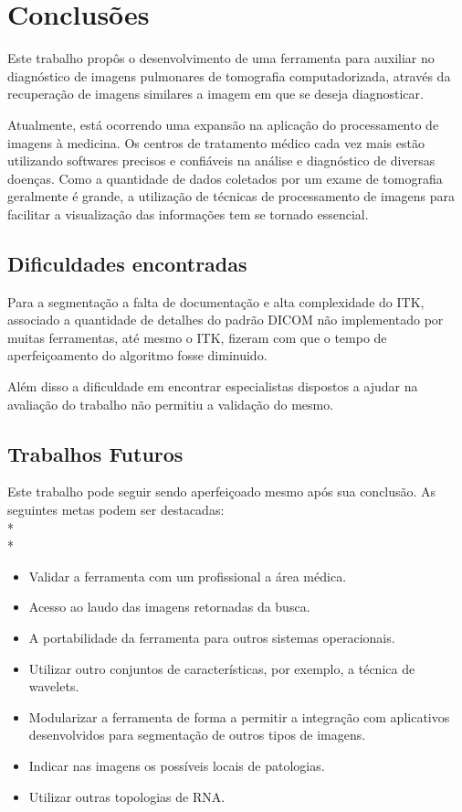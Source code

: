\chapter{Conclusões}

Este trabalho propôs o desenvolvimento de uma ferramenta para auxiliar no diagnóstico de imagens pulmonares de tomografia computadorizada, através da recuperação de imagens similares a imagem em que se deseja diagnosticar.

Atualmente, está ocorrendo uma expansão na aplicação do processamento de imagens à medicina. Os centros de tratamento médico cada vez mais estão utilizando softwares precisos e confiáveis na análise e diagnóstico de diversas doenças. Como a quantidade de dados coletados por um exame de tomografia geralmente é grande, a utilização de técnicas de processamento de imagens para facilitar a visualização das informações tem se tornado essencial.

\section{Dificuldades encontradas}

Para a segmentação a falta de documentação e alta complexidade do ITK, associado a quantidade de detalhes do padrão DICOM não implementado por muitas ferramentas, até mesmo o ITK, fizeram com que o tempo de aperfeiçoamento do algoritmo fosse diminuido.

Além disso a dificuldade em encontrar especialistas dispostos a ajudar na avaliação do trabalho não permitiu a validação do mesmo.

\section{Trabalhos Futuros}

Este trabalho pode seguir sendo aperfeiçoado mesmo após sua conclusão. As seguintes metas podem ser destacadas:
\\* \\*
\begin{itemize}
 \item Validar a ferramenta com um profissional a área médica.
 \item Acesso ao laudo das imagens retornadas da busca.
 \item A portabilidade da ferramenta para outros sistemas operacionais.
 \item Utilizar outro conjuntos de características, por exemplo, a técnica de wavelets.
 \item Modularizar a ferramenta de forma a permitir a integração com aplicativos desenvolvidos para segmentação de outros tipos de imagens.
 \item Indicar nas imagens os possíveis locais de patologias.
 \item Utilizar outras topologias de RNA.
\end{itemize}

